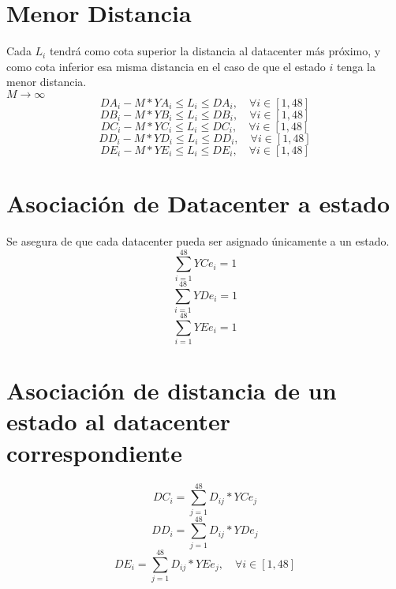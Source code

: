 \documentclass{article}
\begin{document}
\section{Menor Distancia}
Cada $L_i$ tendr\'a como cota superior la distancia al datacenter m\'as pr\'oximo, y como cota inferior esa misma distancia en el caso de que el estado $i$ tenga la menor distancia.\\
$M \rightarrow \infty$
\begin{equation}
DA_{i} - M * YA_{i} \leq L_{i} \leq DA_{i}, \quad \forall i \in [1, 48]
\end{equation}
\begin{equation}
DB_{i} - M * YB_{i} \leq L_{i} \leq DB_{i}, \quad \forall i \in [1, 48]
\end{equation}
\begin{equation}
DC_{i} - M * YC_{i} \leq L_{i} \leq DC_{i}, \quad \forall i \in [1, 48]
\end{equation}
\begin{equation}
DD_{i} - M * YD_{i} \leq L_{i} \leq DD_{i}, \quad \forall i \in [1, 48]
\end{equation}
\begin{equation}
DE_{i} - M * YE_{i} \leq L_{i} \leq DE_{i}, \quad \forall i \in [1, 48]
\end{equation}

\section{Asociaci\'on de Datacenter a estado}
Se asegura de que cada datacenter pueda ser asignado \'unicamente a un estado.
\begin{equation}
\sum_{i=1}^{48} YCe_{i}  = 1
\end{equation}
\begin{equation}
\sum_{i=1}^{48} YDe_{i}  = 1
\end{equation}
\begin{equation}
\sum_{i=1}^{48} YEe_{i}  = 1
\end{equation}

\section{Asociaci\'on de distancia de un estado al datacenter correspondiente}
\begin{equation}
DC_{i} = 
\sum_{j=1}^{48} D_{ij} * YCe_{j}          
\end{equation}
\begin{equation}
DD_{i} = 
\sum_{j=1}^{48} D_{ij} * YDe_{j}          
\end{equation}
\begin{equation}
DE_{i} = 
\sum_{j=1}^{48} D_{ij} * YEe_{j}, \quad \forall i \in [1, 48]
\end{equation}
\end{document}
